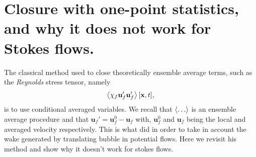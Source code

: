 \section{Closure with one-point statistics, and why it does not work for Stokes flows.}

The classical method used to close theoretically ensemble average terms, such as the \textit{Reynolds} stress tensor, namely 
\begin{equation*}
    \left<\chi_f \textbf{u}_f' \textbf{u}_f'\right>[\textbf{x},t],
\end{equation*} 
is to use conditional averaged variables.
We recall that $\left<\ldots\right>$ is an ensemble average procedure and that $\textbf{u}_f' = \textbf{u}_f^0 - \textbf{u}_f$ with,  $\textbf{u}_f^0$ and $\textbf{u}_f$ being the local and averaged velocity respectively.
This is what \citet{van1998pseudo} did in order to take in account the wake generated by translating bubble in potential flows. 
Here we revisit his method and show why it doesn't work for stokes flows. 

